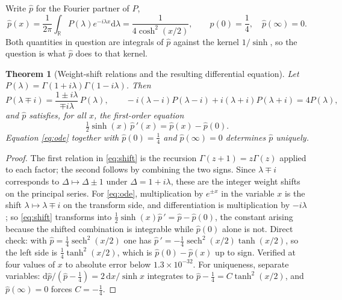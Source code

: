 \documentclass[12pt,a4paper]{article}
\theoremstyle{plain}
\newtheorem{theorem}{Theorem}[section]
\theoremstyle{definition}
\theoremstyle{remark}
\newcommand{\R}{\mathbb{R}}
\newcommand{\dd}{\mathrm{d}}
\begin{document}
Write $\hat p$ for the Fourier partner of $P$,
\begin{equation}
\hat p(x)=\frac{1}{2\pi}\int_\R P(\lambda)e^{-i\lambda x}\dd\lambda
=\frac{1}{4\cosh^2(x/2)},
\qquad \hat p(0)=\frac14,\quad \hat p(\infty)=0 .
\label{eq:phat}
\end{equation}
Both quantities in question are integrals of $\hat p$ against the
kernel $1/\sinh$, so the question is what $\hat p$ does to that kernel.

\begin{theorem}[Weight-shift relations and the resulting differential equation]
\label{thm:ode}
Let $P(\lambda)=\Gamma(1+i\lambda)\Gamma(1-i\lambda)$. Then
\begin{equation}
P(\lambda\mp i)=\frac{1\pm i\lambda}{\mp i\lambda}\,P(\lambda),
\qquad
-i(\lambda-i)P(\lambda-i)+i(\lambda+i)P(\lambda+i)=4P(\lambda),
\label{eq:shift}
\end{equation}
and $\hat p$ satisfies, for all $x$, the first-order equation
\begin{equation}
\tfrac12\sinh(x)\,\hat p\,'(x)=\hat p(x)-\hat p(0).
\label{eq:ode}
\end{equation}
Equation \eqref{eq:ode} together with $\hat p(0)=\tfrac14$ and
$\hat p(\infty)=0$ determines $\hat p$ uniquely.
\end{theorem}

\begin{proof}
The first relation in \eqref{eq:shift} is the recursion
$\Gamma(z+1)=z\Gamma(z)$ applied to each factor; the second follows by
combining the two signs. Since $\lambda\mp i$ corresponds to
$\Delta\mapsto\Delta\pm1$ under $\Delta=1+i\lambda$, these are the
integer weight shifts on the principal series. For \eqref{eq:ode},
multiplication by $e^{\pm x}$ in the variable $x$ is the shift
$\lambda\mapsto\lambda\mp i$ on the transform side, and
differentiation is multiplication by $-i\lambda$; so \eqref{eq:shift}
transforms into $\tfrac12\sinh(x)\hat p\,'=\hat p-\hat p(0)$, the
constant arising because the shifted combination is integrable while
$\hat p(0)$ alone is not. Direct check: with
$\hat p=\tfrac14\operatorname{sech}^2(x/2)$ one has
$\hat p\,'=-\tfrac14\operatorname{sech}^2(x/2)\tanh(x/2)$, so the left
side is $\tfrac14\tanh^2(x/2)$, which is $\hat p(0)-\hat p(x)$ up to
sign. Verified at four values of $x$ to absolute error below
$1.3\times10^{-32}$. For uniqueness, separate variables:
$\dd\hat p/(\hat p-\tfrac14)=2\,\dd x/\sinh x$ integrates to
$\hat p-\tfrac14=C\tanh^2(x/2)$, and $\hat p(\infty)=0$ forces
$C=-\tfrac14$.
\end{proof}
\end{document}
